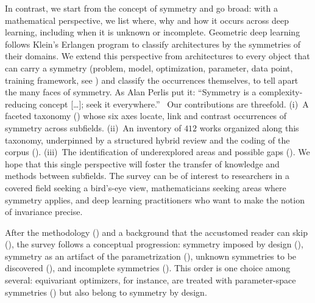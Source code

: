 \documentclass[mathematics,review,submit,moreauthors]{Definitions/mdpi}
\begin{document}
In contrast, we start from the concept of symmetry and go broad: with a mathematical perspective, we list where, why and how it occurs across deep learning, including when it is unknown or incomplete.
Geometric deep learning~\citep{bronstein2021} follows Klein's Erlangen program to classify architectures by the symmetries of their domains.
We extend this perspective from architectures to every object that can carry a symmetry (problem, model, optimization, parameter, data point, training framework, see ) and classify the occurrences themselves, to tell apart the many faces of symmetry.
As Alan Perlis put it: ``Symmetry is a complexity-reducing concept […]; seek it everywhere.''~\citep{perlis1982}
Our contributions are threefold.
(i)~A faceted taxonomy () whose six axes locate, link and contrast occurrences of symmetry across subfields.
(ii)~An inventory of $412$ works organized along this taxonomy, underpinned by a structured hybrid review and the coding of the corpus ().
(iii)~The identification of underexplored areas and possible gaps ().
We hope that this single perspective will foster the transfer of knowledge and methods between subfields.
The survey can be of interest to researchers in a covered field seeking a bird's-eye view, mathematicians seeking areas where symmetry applies, and deep learning practitioners who want to make the notion of invariance precise.

After the methodology () and a background that the accustomed reader can skip (), the survey follows a conceptual progression: symmetry imposed by design (), symmetry as an artifact of the parametrization (), unknown symmetries to be discovered (), and incomplete symmetries ().
This order is one choice among several: equivariant optimizers, for instance, are treated with parameter-space symmetries () but also belong to symmetry by design.
\end{document}
